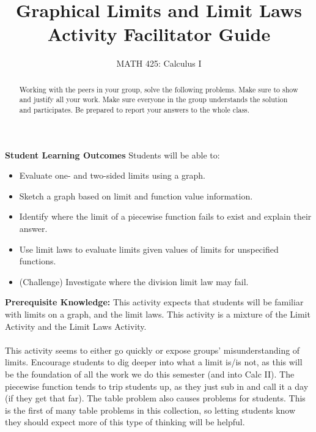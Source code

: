 \documentclass{ximera}
\title{Graphical Limits and Limit Laws Activity Facilitator Guide}
\author{MATH 425: Calculus I}
\begin{document}
\begin{abstract}
    Working with the peers in your group, solve the following problems. Make sure to show and justify all your work. Make sure everyone in the group understands the solution and participates. Be prepared to report your answers to the whole class. 
\end{abstract}
\maketitle

\textbf{Student Learning Outcomes}
Students will be able to:
  \begin{itemize}   
    \item Evaluate one- and two-sided limits using a graph.
    \item Sketch a graph based on limit and function value information.
     \item Identify where the limit of a piecewise function fails to exist and explain their answer.
    \item Use limit laws to evaluate limits given values of limits for unspecified functions.
    \item (Challenge) Investigate where the division limit law may fail.
  \end{itemize}

\textbf{Prerequisite Knowledge:} This activity expects that students will be familiar with limits on a graph, and the limit laws.  This activity is a mixture of the Limit Activity and the Limit Laws Activity.  \\
\\

This activity seems to either go quickly or expose groups' misunderstanding of limits. Encourage students to dig deeper into what a limit is/is not, as this will be the foundation of all the work we do this semester (and into Calc II). The piecewise function tends to trip students up, as they just sub in and call it a day (if they get that far).  The table problem also causes problems for students.  This is the first of many table problems in this collection, so letting students know they should expect more of this type of thinking will be helpful. 
\end{document}
